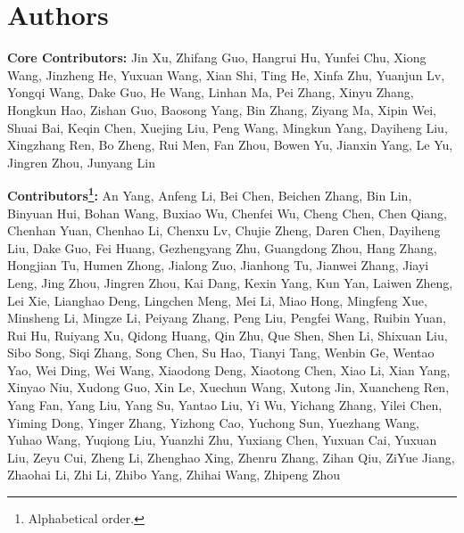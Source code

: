 \section{Authors}
\textbf{Core Contributors:} Jin Xu, Zhifang Guo, Hangrui Hu, Yunfei Chu, Xiong Wang, Jinzheng He, Yuxuan Wang, Xian Shi, Ting He, Xinfa Zhu, Yuanjun Lv, Yongqi Wang, Dake Guo, He Wang, Linhan Ma, Pei Zhang, Xinyu Zhang, Hongkun Hao, Zishan Guo, Baosong Yang, Bin Zhang, Ziyang Ma, Xipin Wei, Shuai Bai, Keqin Chen, Xuejing Liu, Peng Wang, Mingkun Yang, Dayiheng Liu, Xingzhang Ren, Bo Zheng, Rui Men, Fan Zhou, Bowen Yu, Jianxin Yang, Le Yu, Jingren Zhou, Junyang Lin

\textbf{Contributors\footnote{Alphabetical order.}:} An Yang, Anfeng Li, Bei Chen, Beichen Zhang, Bin Lin, Binyuan Hui, Bohan Wang, Buxiao Wu, Chenfei Wu, Cheng Chen, Chen Qiang, Chenhan Yuan, Chenhao Li, Chenxu Lv, Chujie Zheng, Daren Chen, Dayiheng Liu, Dake Guo, Fei Huang, Gezhengyang Zhu, Guangdong Zhou, Hang Zhang, Hongjian Tu, Humen Zhong, Jialong Zuo, Jianhong Tu, Jianwei Zhang, Jiayi Leng, Jing Zhou, Jingren Zhou, Kai Dang, Kexin Yang, Kun Yan, Laiwen Zheng, Lei Xie, Lianghao Deng, Lingchen Meng, Mei Li, Miao Hong, Mingfeng Xue, Minsheng Li, Mingze Li, Peiyang Zhang, Peng Liu, Pengfei Wang, Ruibin Yuan, Rui Hu, Ruiyang Xu, Qidong Huang, Qin Zhu, Que Shen, Shen Li, Shixuan Liu, Sibo Song, Siqi Zhang, Song Chen, Su Hao, Tianyi Tang, Wenbin Ge, Wentao Yao, Wei Ding, Wei Wang, Xiaodong Deng, Xiaotong Chen, Xiao Li, Xian Yang, Xinyao Niu, Xudong Guo, Xin Le, Xuechun Wang, Xutong Jin, Xuancheng Ren, Yang Fan, Yang Liu, Yang Su, Yantao Liu, Yi Wu, Yichang Zhang, Yilei Chen, Yiming Dong, Yinger Zhang, Yizhong Cao, Yuchong Sun, Yuezhang Wang, Yuhao Wang, Yuqiong Liu, Yuanzhi Zhu, Yuxiang Chen, Yuxuan Cai, Yuxuan Liu, Zeyu Cui, Zheng Li, Zhenghao Xing, Zhenru Zhang, Zihan Qiu, ZiYue Jiang, Zhaohai Li, Zhi Li, Zhibo Yang, Zhihai Wang, Zhipeng Zhou


